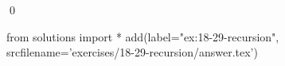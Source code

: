 
\begin{ex}
  \label{ex:18-29-recursion}
  
  \qed
\end{ex}
\begin{python0}
from solutions import *
add(label="ex:18-29-recursion",
    srcfilename='exercises/18-29-recursion/answer.tex')
\end{python0}
